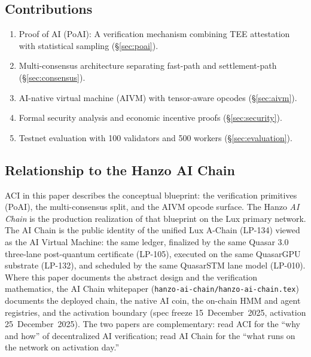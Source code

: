 \subsection{Contributions}

\begin{enumerate}[leftmargin=1.4em]
    \item Proof of AI (PoAI): A verification mechanism combining TEE attestation with statistical sampling (\S\ref{sec:poai}).
    \item Multi-consensus architecture separating fast-path and settlement-path (\S\ref{sec:consensus}).
    \item AI-native virtual machine (AIVM) with tensor-aware opcodes (\S\ref{sec:aivm}).
    \item Formal security analysis and economic incentive proofs (\S\ref{sec:security}).
    \item Testnet evaluation with 100 validators and 500 workers (\S\ref{sec:evaluation}).
\end{enumerate}

\subsection{Relationship to the Hanzo AI Chain}
\label{sec:aci-vs-aichain}

ACI in this paper describes the conceptual blueprint: the verification
primitives (PoAI), the multi-consensus split, and the AIVM opcode
surface. The Hanzo \emph{AI Chain} is the production realization of
that blueprint on the Lux primary network. The AI Chain is the public
identity of the unified Lux A-Chain (LP-134) viewed as the AI Virtual
Machine: the same ledger, finalized by the same Quasar 3.0 three-lane
post-quantum certificate (LP-105), executed on the same QuasarGPU
substrate (LP-132), and scheduled by the same QuasarSTM lane model
(LP-010). Where this paper documents the abstract design and the
verification mathematics, the AI Chain whitepaper
(\texttt{hanzo-ai-chain/hanzo-ai-chain.tex}) documents the deployed
chain, the native AI coin, the on-chain HMM and agent registries, and
the activation boundary (spec freeze 15~December~2025, activation
25~December~2025). The two papers are complementary: read ACI for the
``why and how'' of decentralized AI verification; read AI Chain for the
``what runs on the network on activation day.''

